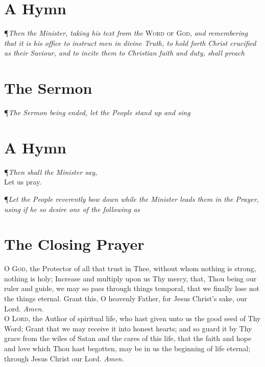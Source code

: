 \section*{A Hymn}

\P \textit{Then the Minister, taking his text from the} \textsc{Word of God,} \textit{and remembering that it is his office to instruct men in divine Truth, to hold forth Christ crucified as their Saviour, and to incite them to Christian faith and duty, shall preach}

\section*{The Sermon}

{\centering \P \textit{The Sermon being ended, let the People stand up and sing}\par}

\section*{A Hymn}

\begin{center}
\P \textit{Then shall the Minister say,} \\
\vspace{1ex}
Let us pray. \\
\vspace{1ex}
\end{center}
\P \textit{Let the People reverently bow down while the Minister leads them in the Prayer, using if he so desire one of the following as}

\section*{The Closing Prayer}

\lettrine{O}{ God}, the Protector of all that trust in Thee, without whom nothing is strong, nothing is holy; Increase and multiply upon us Thy mercy, that, Thou being our ruler and guide, we may so pass through things temporal, that we finally lose not the things eternal.
Grant this, O heavenly Father, for Jesus Christ's sake, our Lord.
\textit{Amen.} \\

\noindent\lettrine{O}{ Lord}, the Author of spiritual life, who hast given unto us the good seed of Thy Word; Grant that we may receive it into honest hearts; and so guard it by Thy grace from the wiles of Satan and the cares of this life, that the faith and hope and love which Thou hast begotten, may be in us the beginning of life eternal; through Jesus Christ our Lord.
\textit{Amen.} \\

